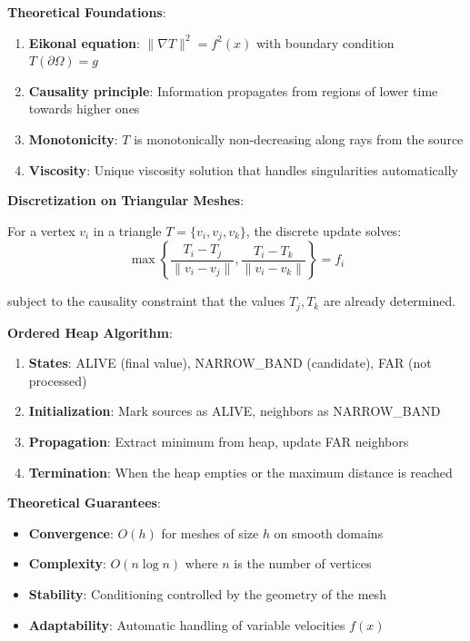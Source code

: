 \textbf{Theoretical Foundations}:
\begin{enumerate}
    \item \textbf{Eikonal equation}: $\|\nabla T\|^2 = f^2(x)$ with boundary condition $T(\partial \Omega) = g$
    \item \textbf{Causality principle}: Information propagates from regions of lower time towards higher ones
    \item \textbf{Monotonicity}: $T$ is monotonically non-decreasing along rays from the source
    \item \textbf{Viscosity}: Unique viscosity solution that handles singularities automatically
\end{enumerate}

\textbf{Discretization on Triangular Meshes}:

For a vertex $v_i$ in a triangle $T = \{v_i, v_j, v_k\}$, the discrete update solves:
\begin{equation}
\max\left\{\frac{T_i - T_j}{\|v_i - v_j\|}, \frac{T_i - T_k}{\|v_i - v_k\|}\right\} = f_i
\end{equation}

subject to the causality constraint that the values $T_j, T_k$ are already determined.

\textbf{Ordered Heap Algorithm}:
\begin{enumerate}
    \item \textbf{States}: ALIVE (final value), NARROW\_BAND (candidate), FAR (not processed)
    \item \textbf{Initialization}: Mark sources as ALIVE, neighbors as NARROW\_BAND
    \item \textbf{Propagation}: Extract minimum from heap, update FAR neighbors
    \item \textbf{Termination}: When the heap empties or the maximum distance is reached
\end{enumerate}

\textbf{Theoretical Guarantees}:
\begin{itemize}
    \item \textbf{Convergence}: $O(h)$ for meshes of size $h$ on smooth domains
    \item \textbf{Complexity}: $O(n \log n)$ where $n$ is the number of vertices
    \item \textbf{Stability}: Conditioning controlled by the geometry of the mesh
    \item \textbf{Adaptability}: Automatic handling of variable velocities $f(x)$
\end{itemize}

